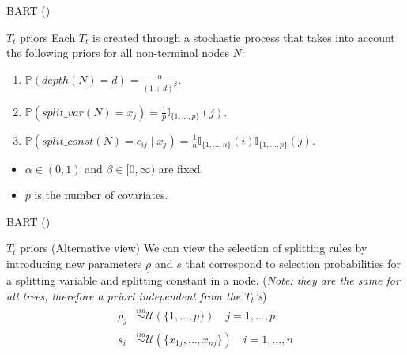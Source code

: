 \documentclass[10pt]{beamer}
\begin{document}
\begin{frame}{BART (\cite{Chipman_2010})}
   \begin{block}{$T_t$ priors}
        Each $T_t$ is created through a stochastic process that takes into account the following priors for all non-terminal nodes $N$: 
        \begin{enumerate}
            \item $\mathbb{P}\left(depth(N) = d\right) = \frac{\alpha}{\left(1+d\right)^\beta}$.
            \item $\mathbb{P}\left(split\_var(N) = x_j\right) = \frac{1}{p}\mathbb{I}_{\{1,...,p\}}(j)$.
            \item $\mathbb{P}\left(split\_const(N) = c_{ij} \mid x_j\right) = \frac{1}{n}\mathbb{I}_{\{1,...,n\}}(i)\mathbb{I}_{\{1,...,p\}}(j)$. 
        \end{enumerate}
    \end{block}
    \begin{itemize}
    \item $\alpha \in (0,1)$ and $\beta \in [0, \infty)$ are fixed.
        \item $p$ is the number of covariates.
    \end{itemize}
\end{frame}

\begin{frame}{BART (\cite{Chipman_2010})}
   \begin{block}{$T_t$ priors (Alternative view)}
        We can view the selection of splitting rules by introducing new parameters $\underline{\rho}$ and $\underline{s}$ that correspond to selection probabilities for a splitting variable and splitting constant in a node. (\textit{Note: they are the same for all trees, therefore a priori independent from the $T_t$'s})
        \begin{align}
            \rho_j &\stackrel{iid}{\sim} \mathcal{U}(\{1,\dots,p\}) \quad j = 1,\dots,p\\
            s_i &\stackrel{iid}{\sim} \mathcal{U}(\{x_{1j},\dots,x_{nj}\}) \quad i = 1,\dots,n
        \end{align}
    \end{block}
\end{frame}
\end{document}
